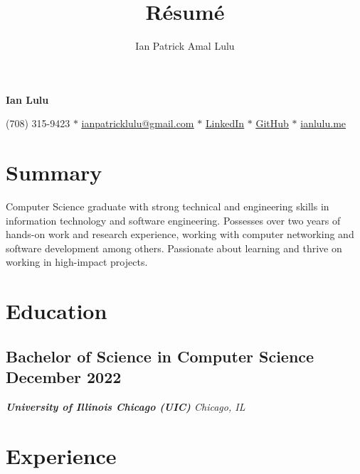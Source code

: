 \documentclass{article}
\makeatletter
\renewcommand{\maketitle}{
    \begin{center}
    {\bfseries\huge
    Ian Lulu}
    
    \vspace{0.25em}

    (708) 315-9423 {$\ast$} \href{mailto:ianpatricklulu@gmail.com}{\underline{ianpatricklulu@gmail.com}} {$\ast$} \href{https://www.linkedin.com/in/ianlulu/}{\underline{LinkedIn}} {$\ast$} \href{https://github.com/IanLulu}{\underline{GitHub}} {$\ast$} \url{ianlulu.me}
    
    \end{center}
}
\makeatother
\begin{document}
\title{R\'esum\'e}
\author{Ian Patrick Amal Lulu}


\maketitle
{} %


\section{Summary}
Computer Science graduate with strong technical and engineering skills in information technology and software engineering.
Possesses over two years of hands-on work and research experience, working with computer networking and software development among others.
Passionate about learning and thrive on working in high-impact projects.


\section{Education}
\subsection{Bachelor of Science in Computer Science \hfill \textnormal{December 2022}}
\vspace{-0.5em}
\textit{\textbf{University of Illinois Chicago (UIC)} \hfill Chicago, IL}


\section{Experience}
\end{document}
